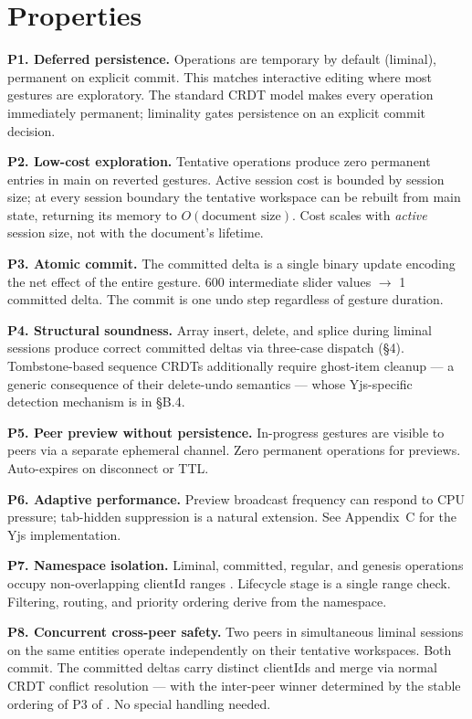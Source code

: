 \section{Properties}

\textbf{P1. Deferred persistence.} Operations are temporary by default (liminal), permanent on explicit commit. This matches interactive editing where most gestures are exploratory. The standard CRDT model makes every operation immediately permanent; liminality gates persistence on an explicit commit decision.

\textbf{P2. Low-cost exploration.} Tentative operations produce zero permanent entries in main on reverted gestures. Active session cost is bounded by session size; at every session boundary the tentative workspace can be rebuilt from main state, returning its memory to $O(\text{document size})$. Cost scales with \emph{active} session size, not with the document's lifetime.

\textbf{P3. Atomic commit.} The committed delta is a single binary update encoding the net effect of the entire gesture. 600 intermediate slider values $\rightarrow$ 1 committed delta. The commit is one undo step regardless of gesture duration.

\textbf{P4. Structural soundness.} Array insert, delete, and splice during liminal sessions produce correct committed deltas via three-case dispatch (\S4). Tombstone-based sequence CRDTs additionally require ghost-item cleanup --- a generic consequence of their delete-undo semantics --- whose Yjs-specific detection mechanism is in \S B.4.

\textbf{P5. Peer preview without persistence.} In-progress gestures are visible to peers via a separate ephemeral channel. Zero permanent operations for previews. Auto-expires on disconnect or TTL.

\textbf{P6. Adaptive performance.} Preview broadcast frequency can respond to CPU pressure; tab-hidden suppression is a natural extension. See Appendix~C for the Yjs implementation.

\textbf{P7. Namespace isolation.} Liminal, committed, regular, and genesis operations occupy non-overlapping clientId ranges \cite{plexus:partitioning}. Lifecycle stage is a single range check. Filtering, routing, and priority ordering derive from the namespace.

\textbf{P8. Concurrent cross-peer safety.} Two peers in simultaneous liminal sessions on the same entities operate independently on their tentative workspaces. Both commit. The committed deltas carry distinct clientIds and merge via normal CRDT conflict resolution --- with the inter-peer winner determined by the stable ordering of P3 of \cite{plexus:partitioning}. No special handling needed.

